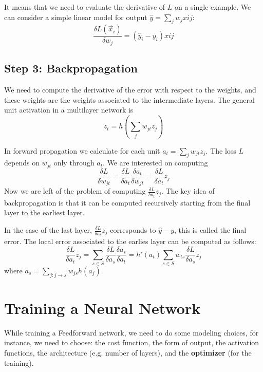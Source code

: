 It means that we need to evaluate the derivative of \(L\) on a single example. We can consider a simple linear model for output \(\hat{y} = \sum_j w_j x{ij}\):
\begin{equation}
    \frac {\delta L(\vec{x}_i)} {\delta w_j} = (\hat{y}_i - y_i) x{ij}
\end{equation}

\subsection{Step 3: Backpropagation}
We need to compute the derivative of the error with respect to the weights, and these weights are the weights associated to the intermediate layers. The general unit activation in a multilayer network is
\begin{equation}
    z_t = h \left( \sum_j w_{jt} z_j \right)
\end{equation}

In forward propagation we calculate for each unit \(a_t = \sum_j w_{jt} z_j\). The loss \(L\) depends on \(w_{jt}\) only through \(a_t\). We are interested on computing
\begin{equation}
    \frac {\delta L} {\delta w_{jt}} = \frac{\delta L} {\delta a_t} \frac {\delta a_t} {\delta w_{jt}} = \frac {\delta L} {\delta a_t} z_j
\end{equation}
Now we are left of the problem of computing \(\frac {\delta L} {\delta a_t} z_j\). The key idea of backpropagation is that it can be computed recursively starting from the final layer to the earliest layer.

In the case of the last layer, \(\frac {\delta L} {\delta a_t} z_j\) corresponds to \(\hat{y} - y\), this is called the final error. The local error associated to the earlies layer can be computed as follows:
\begin{equation}
    \frac {\delta L} {\delta a_t} z_j = \sum_{s \in S} \frac {\delta L} {\delta a_s} \frac {\delta a_s} {\delta a_t} = h'(a_t) \sum_{s \in S} w_{ts} \frac {\delta L} {\delta a_s} z_j
\end{equation}
where \(a_s = \sum_{j:j \to s} w_{js} h(a_j)\).

\section{Training a Neural Network}
While training a Feedforward network, we need to do some modeling choices, for instance, we need to choose: the cost function, the form of output, the activation functions, the architecture (e.g. number of layers), and the \textbf{optimizer} (for the training).

